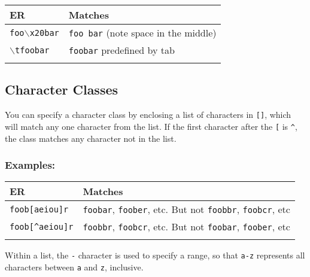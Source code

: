 \begin{footnotesize}
  \begin{tabularx}{\textwidth}{>{\hsize=0.3\hsize}X>{\hsize=0.7\hsize}X}\\
    \hline
    \textbf{ER} & \textbf{Matches} \\
    \hline
    \texttt{foo$\backslash$x20bar} & \texttt{foo bar} (note space in the middle) \\
    \texttt{$\backslash$tfoobar} & \texttt{foobar} predefined by tab \\
    \hline
    \\
  \end{tabularx}
\end{footnotesize}


\subsection{Character Classes}

You can specify a character class by enclosing a list of characters in
\texttt{[]}, which will match any one character from the list. If the
first character after the \texttt{[} is \texttt{\^{}}, the class matches
any character not in the list.


\subsubsection{Examples:}

\begin{footnotesize}
  \begin{tabularx}{\textwidth}{>{\hsize=0.3\hsize}X>{\hsize=0.7\hsize}X}\\
    \hline
    \textbf{ER} & \textbf{Matches} \\
    \hline
    \texttt{foob[aeiou]r} & \texttt{foobar}, \texttt{foober}, etc. But not \texttt{foobbr}, \texttt{foobcr}, etc \\
    \texttt{foob[\^{}aeiou]r} & \texttt{foobbr}, \texttt{foobcr}, etc. But not \texttt{foobar}, \texttt{foober}, etc \\
    \hline
    \\
  \end{tabularx}
\end{footnotesize}

Within a list, the \texttt{-} character is used to specify a range, so
that \texttt{a-z} represents all characters between \texttt{a} and
\texttt{z}, inclusive.

